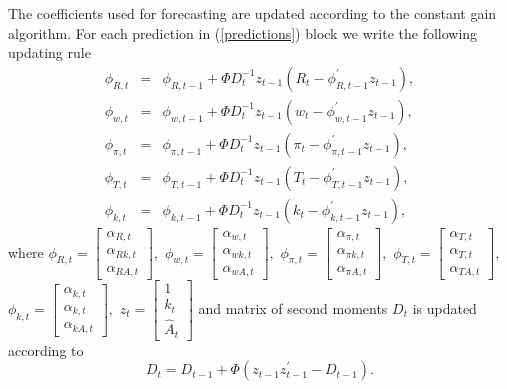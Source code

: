 \documentclass{article}
\begin{document}
The coefficients used for forecasting are updated according to the constant
gain algorithm. For each prediction in (\ref{predictions}) block we write
the following updating rule%
\begin{eqnarray}
\phi _{R,t} &=&\phi _{R,t-1}+\Phi D_{t}^{-1}z_{t-1}\left( R_{t}-\phi
_{R,t-1}^{\prime }z_{t-1}\right) , \\
\phi _{w,t} &=&\phi _{w,t-1}+\Phi D_{t}^{-1}z_{t-1}\left( w_{t}-\phi
_{w,t-1}^{\prime }z_{t-1}\right) ,  \nonumber \\
\phi _{\pi ,t} &=&\phi _{\pi ,t-1}+\Phi D_{t}^{-1}z_{t-1}\left( \pi
_{t}-\phi _{\pi ,t-1}^{\prime }z_{t-1}\right) ,  \nonumber \\
\phi _{T,t} &=&\phi _{T,t-1}+\Phi D_{t}^{-1}z_{t-1}\left( T_{t}-\phi
_{T,t-1}^{\prime }z_{t-1}\right) ,  \nonumber \\
\phi _{k,t} &=&\phi _{k,t-1}+\Phi D_{t}^{-1}z_{t-1}\left( k_{t}-\phi
_{k,t-1}^{\prime }z_{t-1}\right) ,
\end{eqnarray}%
where $\phi _{R,t}=\left[ 
\begin{array}{c}
\alpha _{R,t} \\ 
\alpha _{Rk,t} \\ 
\alpha _{RA,t}%
\end{array}%
\right] ,$ $\phi _{w,t}=\left[ 
\begin{array}{c}
\alpha _{w,t} \\ 
\alpha _{wk,t} \\ 
\alpha _{wA,t}%
\end{array}%
\right] ,$ $\phi _{\pi ,t}=\left[ 
\begin{array}{c}
\alpha _{\pi ,t} \\ 
\alpha _{\pi k,t} \\ 
\alpha _{\pi A,t}%
\end{array}%
\right] ,$ $\phi _{T,t}=\left[ 
\begin{array}{c}
\alpha _{T,t} \\ 
\alpha _{T,t} \\ 
\alpha _{TA,t}%
\end{array}%
\right] ,$ $\phi _{k,t}=\left[ 
\begin{array}{c}
\alpha _{k,t} \\ 
\alpha _{k,t} \\ 
\alpha _{kA,t}%
\end{array}%
\right] ,$ $z_{t}=\left[ 
\begin{array}{c}
1 \\ 
k_{t} \\ 
\widehat{A}_{t}%
\end{array}%
\right] $ and matrix of second moments $D_{t}$ is updated according to%
\begin{equation}
D_{t}=D_{t-1}+\Phi \left( z_{t-1}z_{t-1}^{\prime }-D_{t-1}\right) .
\end{equation}
\end{document}
